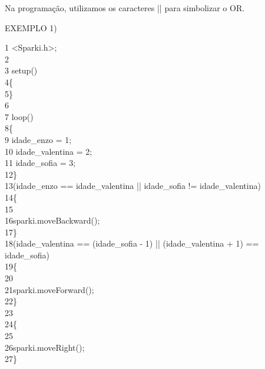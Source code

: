 \documentclass[conference]{IEEEtran}
\begin{document}
\par
Na programação, utilizamos os caracteres || para simbolizar o OR.
\\
\begin{center}
EXEMPLO 1)
\end{center}
{\selectfont 
{\color{cinza}1} <Sparki.h>;\\
{\color{cinza}2}\quad\\
{\color{cinza}3} setup()\\
{\color{cinza}4}\quad\{\\
{\color{cinza}5}\quad\}\\
{\color{cinza}6}\quad\\
{\color{cinza}7} loop()\\
{\color{cinza}8}\quad\{\\
{\color{cinza}9}\quad{} idade\_enzo = 1;\\
{\color{cinza}10}\quad{} idade\_valentina = 2;\\
{\color{cinza}11}\quad{} idade\_sofia = 3;\\
{\color{cinza}12}\quad\}\\
{\color{cinza}13}(idade\_enzo == idade\_valentina {\color{verde}||} idade\_sofia != idade\_valentina)\\
{\color{cinza}14}\quad\{\\
{\color{cinza}15}\quad{}\\
{\color{cinza}16}\quad\quad sparki.moveBackward();\\
{\color{cinza}17}\quad\}\\
{\color{cinza}18}(idade\_valentina == (idade\_sofia - 1) {\color{verde}||} (idade\_valentina + 1) == idade\_sofia)\\
{\color{cinza}19}\quad\{\\
{\color{cinza}20}\quad{}\\
{\color{cinza}21}\quad\quad sparki.moveForward();\\
{\color{cinza}22}\quad\}\\
{\color{cinza}23}\\
{\color{cinza}24}\quad\{\\
{\color{cinza}25}\quad{}\\
{\color{cinza}26}\quad\quad sparki.moveRight();\\
{\color{cinza}27}\quad\}}
\end{document}
